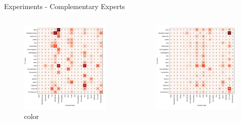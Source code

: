 \documentclass[]{beamer}
\begin{document}
\begin{frame}{Experiments - Complementary Experts}
\begin{columns}
	\begin{column}{0.5\textwidth}
		\begin{figure}
			\includegraphics[scale=.2]{../thesis/img/chapter6/UnrealGTClass_color.png}
			\caption{color}
		\end{figure}	
	\end{column}
	\quad
	\begin{column}{0.5\textwidth}
		\begin{figure}
			\includegraphics[scale=.2]{../thesis/img/chapter6/UnrealGTClass_size.png}

\end{figure}
\end{column}
\end{columns}
\end{frame}
\end{document}
